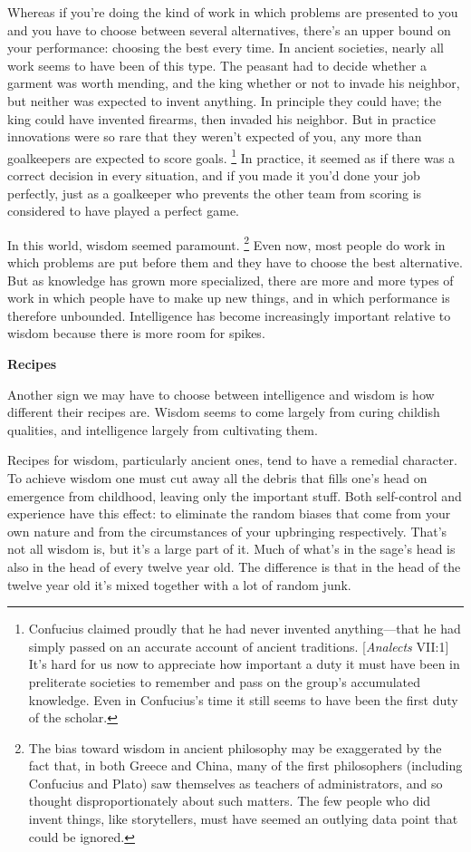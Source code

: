Whereas if you're doing the kind of work in which problems are presented
to you and you have to choose between several alternatives, there's an
upper bound on your performance: choosing the best every time. In
ancient societies, nearly all work seems to have been of this type. The
peasant had to decide whether a garment was worth mending, and the king
whether or not to invade his neighbor, but neither was expected to
invent anything. In principle they could have; the king could have
invented firearms, then invaded his neighbor. But in practice
innovations were so rare that they weren't expected of you, any more
than goalkeepers are expected to score goals. \footnote{Confucius claimed proudly that he had never invented
anything---that he had simply passed on an accurate account of ancient
traditions. {[}\emph{Analects} VII:1{]} It's hard for us now to
appreciate how important a duty it must have been in preliterate
societies to remember and pass on the group's accumulated knowledge.
Even in Confucius's time it still seems to have been the first duty of
the scholar.} In
practice, it seemed as if there was a correct decision in every
situation, and if you made it you'd done your job perfectly, just as a
goalkeeper who prevents the other team from scoring is considered to
have played a perfect game.

In this world, wisdom seemed paramount. \footnote{The bias toward wisdom in ancient philosophy may be exaggerated
by the fact that, in both Greece and China, many of the first
philosophers (including Confucius and Plato) saw themselves as teachers
of administrators, and so thought disproportionately about such matters.
The few people who did invent things, like storytellers, must have
seemed an outlying data point that could be ignored.} Even
now, most people do work in which problems are put before them and they
have to choose the best alternative. But as knowledge has grown more
specialized, there are more and more types of work in which people have
to make up new things, and in which performance is therefore unbounded.
Intelligence has become increasingly important relative to wisdom
because there is more room for spikes.

\textbf{Recipes}

Another sign we may have to choose between intelligence and wisdom is
how different their recipes are. Wisdom seems to come largely from
curing childish qualities, and intelligence largely from cultivating
them.

Recipes for wisdom, particularly ancient ones, tend to have a remedial
character. To achieve wisdom one must cut away all the debris that fills
one's head on emergence from childhood, leaving only the important
stuff. Both self-control and experience have this effect: to eliminate
the random biases that come from your own nature and from the
circumstances of your upbringing respectively. That's not all wisdom is,
but it's a large part of it. Much of what's in the sage's head is also
in the head of every twelve year old. The difference is that in the head
of the twelve year old it's mixed together with a lot of random junk.

